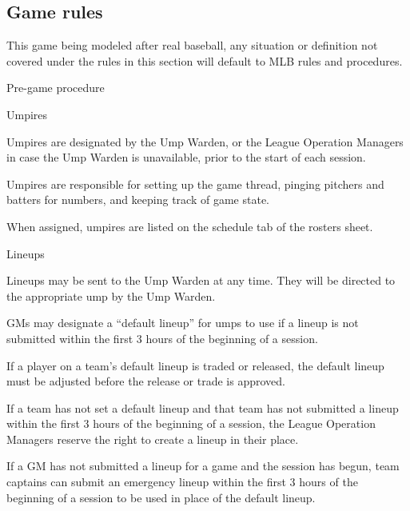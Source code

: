
\subsection{Game rules}
\label{sec:game rules}
\begin{deepEnumerate}
	\item This game being modeled after real baseball, any situation or definition not covered under the rules in this section will default to MLB rules and procedures.
	\item Pre-game procedure
	\begin{deepEnumerate}
		\item Umpires 
		\begin{deepEnumerate}
			\item Umpires are designated by the Ump Warden, or the League Operation Managers in case the Ump Warden is unavailable, prior to the start of each session.
			\item Umpires are responsible for setting up the game thread, pinging pitchers and batters for numbers, and	keeping track of game state.
			\item When assigned, umpires are listed on the schedule tab of the rosters sheet.
		\end{deepEnumerate}
		\item Lineups
		\begin{deepEnumerate}
			\item Lineups may be sent to the Ump Warden at any time. They will be directed to the appropriate ump by the Ump Warden.
			\item GMs may designate a “default lineup” for umps to use if a lineup is not submitted within the first 3 hours of the beginning of a session.
			\begin{deepEnumerate}
				\item If a player on a team’s default lineup is traded or released, the default lineup must be adjusted before the release or trade is approved.
				\item If a team has not set a default lineup and that team has not submitted a lineup within the first 3 hours of the beginning of a session, the League
				Operation Managers reserve the right to create a lineup in their place.
				\item If a GM has not submitted a lineup for a game and the session has begun, 
				\label{sec:captain lineups}
				team captains can submit an emergency lineup within the first 3 hours of the beginning of a session to be used in place of the default lineup.

\end{deepEnumerate}
\end{deepEnumerate}
\end{deepEnumerate}
\end{deepEnumerate}
